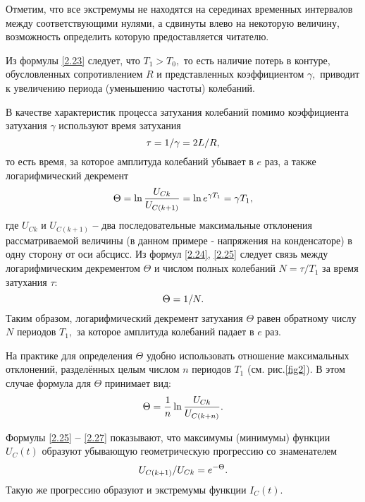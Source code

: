 Отметим, что все экстремумы не находятся на серединах временных интервалов между соответствующими нулями, а сдвинуты влево на некоторую величину, возможность определить которую предоставляется читателю.

Из формулы \eqref{2.23} следует, что $T_1>T_0,$ то есть наличие потерь в контуре, обусловленных сопротивлением $R$ и представленных коэффициентом $\gamma,$ приводит к увеличению периода (уменьшению частоты) колебаний.

В качестве характеристик процесса затухания колебаний помимо коэффициента затухания $\gamma$ используют \textsf{время затухания}
\begin{equation}\eqmark{2.24}
\tau=1/\gamma=2L/R,
\end{equation}
то есть время, за которое амплитуда колебаний убывает в $e$ раз, а также \textsf{логарифмический декремент}
\begin{equation}\eqmark{2.25}
\Theta=\ln\dfrac{U_{Ck}}{U_{C(k+1)}}=\ln e^{\gamma T_1}=\gamma T_1,
\end{equation}
где $U_{Ck}$ и $U_{C(k+1)}$ \textbf{--} два последовательные максимальные отклонения рассматриваемой величины (в данном примере - напряжения на конденсаторе) в одну сторону от оси абсцисс. Из формул \eqref{2.24}, \eqref{2.25} следует связь между логарифмическим декрементом $\Theta$ и числом полных колебаний $N=\tau/T_1$ за время затухания $\tau:$
\begin{equation}\eqmark{2.26}
\Theta=1/N.
\end{equation}
Таким образом, логарифмический декремент затухания $\Theta$ равен обратному числу $N$ периодов  $T_1,$ за которое амплитуда колебаний падает в $e$ раз.
 
На практике для определения $\Theta$ удобно использовать отношение максимальных отклонений, разделённых целым числом $n$ периодов $T_1$ (см. рис.\ref{fig2}). В этом случае формула для $\Theta$ принимает вид:
\begin{equation}\eqmark{2.27}
\Theta=\dfrac{1}{n}\ln\dfrac{U_{Ck}}{U_{C(k+n)}}.
\end{equation}

Формулы \eqref{2.25} \textbf{--} \eqref{2.27} показывают, что максимумы (минимумы) функции $U_C(t)$ образуют убывающую геометрическую прогрессию со знаменателем
\begin{equation}\eqmark{2.28}
U_{C(k+1)}/U_{Ck}=e^{-\Theta}.
\end{equation}
Такую же прогрессию образуют и экстремумы функции $I_C(t).$

